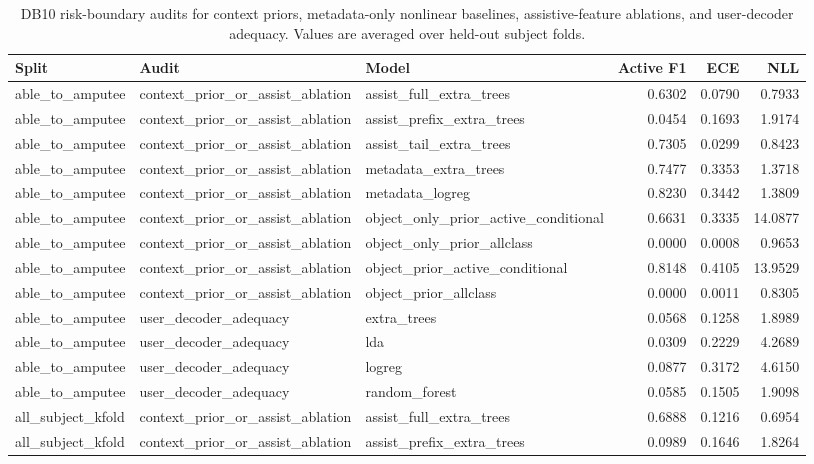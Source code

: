 \begin{table}[!t]
\centering
\caption{DB10 risk-boundary audits for context priors, metadata-only nonlinear baselines, assistive-feature ablations, and user-decoder adequacy. Values are averaged over held-out subject folds.}
\label{tab:db10-reader-robustness}
\scriptsize
\setlength{\tabcolsep}{4pt}
\begin{tabular}{lllrrr}
\toprule
Split & Audit & Model & Active F1 & ECE & NLL \\
\midrule
able\_to\_amputee & context\_prior\_or\_assist\_ablation & assist\_full\_extra\_trees & 0.6302 & 0.0790 & 0.7933 \\
able\_to\_amputee & context\_prior\_or\_assist\_ablation & assist\_prefix\_extra\_trees & 0.0454 & 0.1693 & 1.9174 \\
able\_to\_amputee & context\_prior\_or\_assist\_ablation & assist\_tail\_extra\_trees & 0.7305 & 0.0299 & 0.8423 \\
able\_to\_amputee & context\_prior\_or\_assist\_ablation & metadata\_extra\_trees & 0.7477 & 0.3353 & 1.3718 \\
able\_to\_amputee & context\_prior\_or\_assist\_ablation & metadata\_logreg & 0.8230 & 0.3442 & 1.3809 \\
able\_to\_amputee & context\_prior\_or\_assist\_ablation & object\_only\_prior\_active\_conditional & 0.6631 & 0.3335 & 14.0877 \\
able\_to\_amputee & context\_prior\_or\_assist\_ablation & object\_only\_prior\_allclass & 0.0000 & 0.0008 & 0.9653 \\
able\_to\_amputee & context\_prior\_or\_assist\_ablation & object\_prior\_active\_conditional & 0.8148 & 0.4105 & 13.9529 \\
able\_to\_amputee & context\_prior\_or\_assist\_ablation & object\_prior\_allclass & 0.0000 & 0.0011 & 0.8305 \\
able\_to\_amputee & user\_decoder\_adequacy & extra\_trees & 0.0568 & 0.1258 & 1.8989 \\
able\_to\_amputee & user\_decoder\_adequacy & lda & 0.0309 & 0.2229 & 4.2689 \\
able\_to\_amputee & user\_decoder\_adequacy & logreg & 0.0877 & 0.3172 & 4.6150 \\
able\_to\_amputee & user\_decoder\_adequacy & random\_forest & 0.0585 & 0.1505 & 1.9098 \\
all\_subject\_kfold & context\_prior\_or\_assist\_ablation & assist\_full\_extra\_trees & 0.6888 & 0.1216 & 0.6954 \\
all\_subject\_kfold & context\_prior\_or\_assist\_ablation & assist\_prefix\_extra\_trees & 0.0989 & 0.1646 & 1.8264 \\

\end{tabular}
\end{table}
